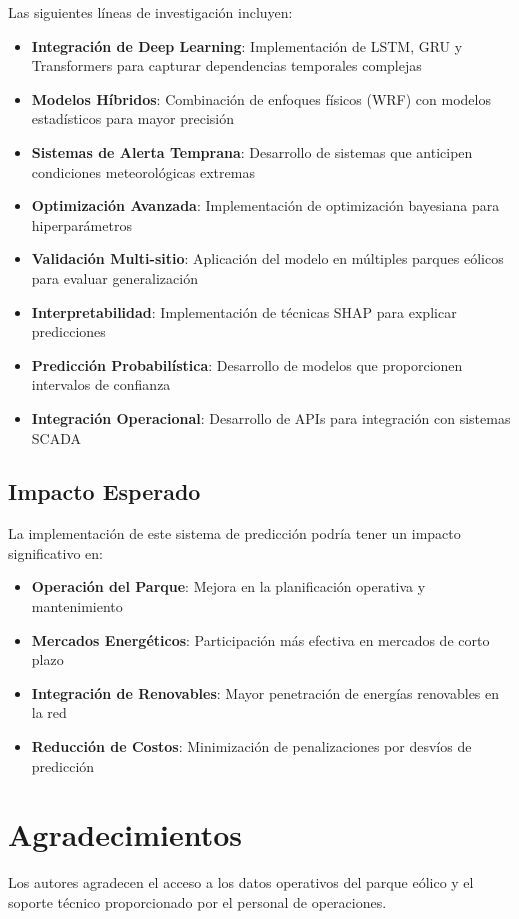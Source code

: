 \documentclass[conference]{IEEEtran}
\begin{document}
	Las siguientes líneas de investigación incluyen:
	\begin{itemize}
		\item \textbf{Integración de Deep Learning}: Implementación de LSTM, GRU y Transformers para capturar dependencias temporales complejas
		\item \textbf{Modelos Híbridos}: Combinación de enfoques físicos (WRF) con modelos estadísticos para mayor precisión
		\item \textbf{Sistemas de Alerta Temprana}: Desarrollo de sistemas que anticipen condiciones meteorológicas extremas
		\item \textbf{Optimización Avanzada}: Implementación de optimización bayesiana para hiperparámetros
		\item \textbf{Validación Multi-sitio}: Aplicación del modelo en múltiples parques eólicos para evaluar generalización
		\item \textbf{Interpretabilidad}: Implementación de técnicas SHAP para explicar predicciones
		\item \textbf{Predicción Probabilística}: Desarrollo de modelos que proporcionen intervalos de confianza
		\item \textbf{Integración Operacional}: Desarrollo de APIs para integración con sistemas SCADA
	\end{itemize}
	
	\subsection{Impacto Esperado}
	La implementación de este sistema de predicción podría tener un impacto significativo en:
	\begin{itemize}
		\item \textbf{Operación del Parque}: Mejora en la planificación operativa y mantenimiento
		\item \textbf{Mercados Energéticos}: Participación más efectiva en mercados de corto plazo
		\item \textbf{Integración de Renovables}: Mayor penetración de energías renovables en la red
		\item \textbf{Reducción de Costos}: Minimización de penalizaciones por desvíos de predicción
	\end{itemize}
	
	\section{Agradecimientos}
	Los autores agradecen el acceso a los datos operativos del parque eólico y el soporte técnico proporcionado por el personal de operaciones.
	
\end{document}
